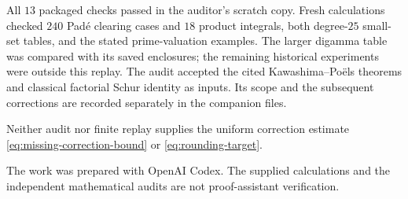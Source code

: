 All $13$ packaged checks passed in the auditor's scratch copy. Fresh
calculations checked $240$ Pad\'e clearing cases and $18$ product
integrals, both degree-$25$ small-set tables, and the stated
prime-valuation examples. The larger digamma table was compared with
its saved enclosures; the remaining historical experiments were outside
this replay. The audit accepted the cited Kawashima--Po\"els theorems
and classical factorial Schur identity as inputs. Its scope and the
subsequent corrections are recorded separately in the companion files.

Neither audit nor finite replay supplies the uniform correction estimate
\eqref{eq:missing-correction-bound} or \eqref{eq:rounding-target}.

The work was prepared with OpenAI Codex. The supplied calculations and
the independent mathematical audits are not proof-assistant verification.

